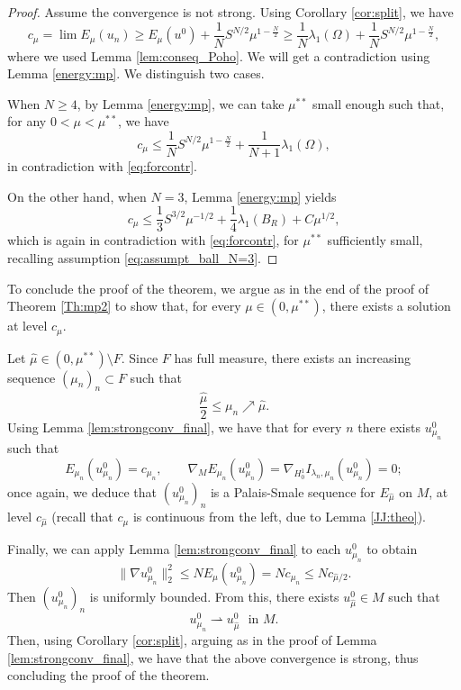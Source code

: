 \documentclass[10pt]{article}
\theoremstyle{definition}
\numberwithin{equation}{section}
\begin{document}
\begin{proof}
Assume the convergence is not strong. Using Corollary \ref{cor:split}, we have
\begin{equation}\label{eq:forcontr}
c_\mu=\lim E_{\mu}(u_{n})\geq E_{\mu}(u^{0})+ \frac{1}{N} S^{N/2}\mu^{1-\frac{N}{2}}
\ge \frac{1}{N}\lambda_{1}(\Omega) + \frac{1}{N} S^{N/2}\mu^{1-\frac{N}{2}},
\end{equation}
where we used Lemma \ref{lem:conseq_Poho}.
We will get a contradiction using Lemma \ref{energy:mp}. We distinguish two cases.

When $N\geq4$, by Lemma \ref{energy:mp}, we can take $\mu^{**}$ small enough such that, for any $0<\mu<\mu^{**}$, we have
\begin{equation*}
c_{\mu}\leq\frac{1}{N}S^{N/2}\mu^{1-\frac{N}{2}} + \frac{1}{N+1}\lambda_{1}(\Omega),
\end{equation*}
in contradiction with \eqref{eq:forcontr}.

On the other hand, when $N=3$, Lemma \ref{energy:mp} yields
\begin{equation*}
c_{\mu}\leq\frac{1}{3}S^{3/2}\mu^{-1/2}+\frac{1}{4}\lambda_{1}(B_{R})+C\mu^{1/2},
\end{equation*}
which is again in contradiction with \eqref{eq:forcontr}, for $\mu^{**}$ sufficiently small,
recalling assumption \eqref{eq:assumpt_ball_N=3}.
\end{proof}

To conclude the proof of the theorem, we argue as in the end of the proof of Theorem \ref{Th:mp2} to
show that, for every $\mu\in(0,\mu^{**})$, there exists a solution at level $c_\mu$.

Let $\hat{\mu}\in (0,\mu^{**})\setminus F$. Since $F$ has full measure, there exists an increasing
sequence $(\mu_{n})_{n}\subset F$ such that
\[
\frac{\hat \mu}{2} \le \mu_{n}\nearrow\hat{\mu}.
\]
Using Lemma
\ref{lem:strongconv_final}, we have that for every $n$ there exists $u_{\mu_{n}}^{0}$ such that
 \[
E_{\mu_{n}}(u^{0}_{\mu_{n}}) = c_{\mu_{n}}, \qquad \nabla_M E_{\mu_{n}}(u^{0}_{\mu_{n}}) =
\nabla_{H^1_0} I_{\lambda_n,\mu_n}(u^{0}_{\mu_{n}})=0;
\]
once again, we deduce that $(u_{\mu_{n}}^{0})_{n}$ is a Palais-Smale sequence for
$E_{\hat\mu}$ on $M$, at level $c_{\hat\mu}$ (recall that $c_\mu$ is continuous from the left,
due to Lemma \ref{JJ:theo}).

Finally, we can apply Lemma \ref{lem:strongconv_final} to each $u^0_{\mu_n}$ to obtain
\[
\|\nabla u_{\mu_n}^0\|_2^2 \le N E_\mu(u_{\mu_n}^0) = N c_{\mu_n} \le N c_{\hat\mu/2}.
\]
Then $(u_{\mu_{n}}^{0})_{n}$ is uniformly bounded. From this, there exists $u_{\hat{\mu}}^{0} \in M$ such that
\[
u_{\mu_{n}}^{0} \rightharpoonup u_{\hat{\mu}}^{0} \ \ \ \text{in } M.
\]
Then, using Corollary \ref{cor:split}, arguing as in the proof of Lemma \ref{lem:strongconv_final}, we have that the above convergence is strong, thus concluding the proof of the theorem.
\bigskip
\end{document}
